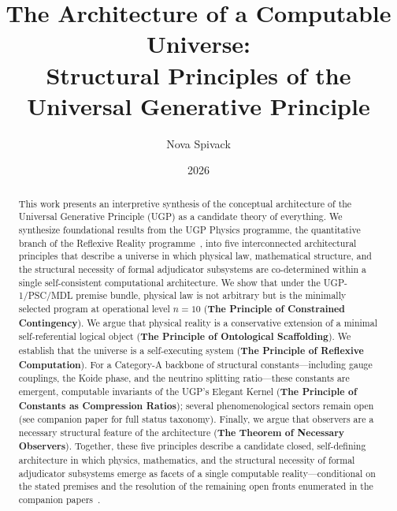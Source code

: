 \documentclass[12pt]{article}
\begin{document}
\title{\textbf{The Architecture of a Computable Universe: \\ Structural Principles of the Universal Generative Principle}}
\author{Nova Spivack}
\date{2026}
\maketitle
\NovaZenodoAfterTitle

\begin{abstract}
This work presents an interpretive synthesis of the conceptual architecture of the Universal Generative Principle (UGP) as a candidate theory of everything.
We synthesize foundational results from the UGP Physics programme, the quantitative branch of the Reflexive Reality programme~\cite{SpivackResearchProgrammes}, into five interconnected architectural principles that describe a universe in which physical law, mathematical structure, and the structural necessity of formal adjudicator subsystems are co-determined within a single self-consistent computational architecture.
We show that under the UGP-1/PSC/MDL premise bundle, physical law is not arbitrary but is the minimally selected program at operational level $n=10$ (\textbf{The Principle of Constrained Contingency}).
We argue that physical reality is a conservative extension of a minimal self-referential logical object (\textbf{The Principle of Ontological Scaffolding}).
We establish that the universe is a self-executing system (\textbf{The Principle of Reflexive Computation}).
For a Category-A backbone of structural constants---including gauge couplings, the Koide phase, and the neutrino splitting ratio---these constants are emergent, computable invariants of the UGP's Elegant Kernel (\textbf{The Principle of Constants as Compression Ratios}); several phenomenological sectors remain open (see companion paper for full status taxonomy).
Finally, we argue that observers are a necessary structural feature of the architecture (\textbf{The Theorem of Necessary Observers}).
Together, these five principles describe a candidate closed, self-defining architecture in which physics, mathematics, and the structural necessity of formal adjudicator subsystems emerge as facets of a single computable reality---conditional on the stated premises and the resolution of the remaining open fronts enumerated in the companion papers~\cite{Spivack2026_SM_UGP,Spivack2026_Koide,Spivack2026_CyclotomicMass}.
\end{abstract}
\end{document}
